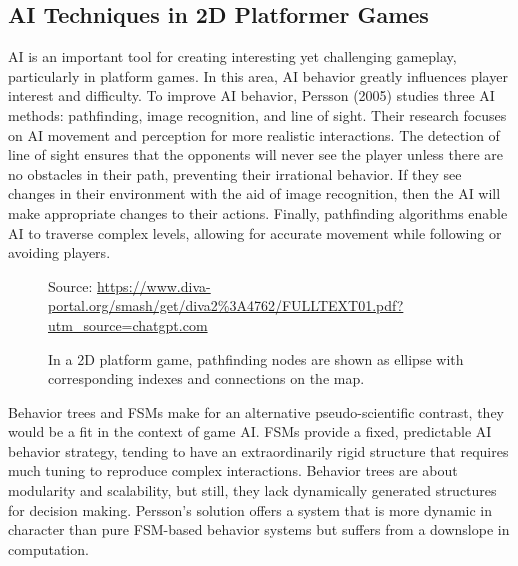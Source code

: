 \documentclass[12pt,oneside,openright,a4paper]{cpe-english-project}
\begin{document}
\subsection{AI Techniques in 2D Platformer Games}
AI is an important tool for creating interesting yet challenging gameplay, particularly in platform games. In this area, AI behavior greatly influences player interest and difficulty. To improve AI behavior, Persson (2005)\cite {platformer_ai} studies three AI methods: pathfinding, image recognition, and line of sight. Their research focuses on AI movement and perception for more realistic interactions. The detection of line of sight ensures that the opponents will never see the player unless there are no obstacles in their path, preventing their irrational behavior. If they see changes in their environment with the aid of image recognition, then the AI will make appropriate changes to their actions. Finally, pathfinding algorithms enable AI to traverse complex levels, allowing for accurate movement while following or avoiding players.\par
\begin{figure}[!h]
\centering
{}
\caption{In a 2D platform game, pathfinding nodes are shown as ellipse with corresponding indexes and connections on the map.}\label{fig:AITechniq}
Source:
\href{https://www.diva-portal.org/smash/get/diva2\%3A4762/FULLTEXT01.pdf?utm\_source=chatgpt.com}{https://www.diva-portal.org/smash/get/diva2\%3A4762/FULLTEXT01.pdf?utm\_source=chatgpt.com}
\end{figure}
Behavior trees and FSMs make for an alternative pseudo-scientific contrast, they would be a fit in the context of game AI. FSMs provide a fixed, predictable AI behavior strategy, tending to have an extraordinarily rigid structure that requires much tuning to reproduce complex interactions. Behavior trees are about modularity and scalability, but still, they lack dynamically generated structures for decision making. Persson's solution offers a system that is more dynamic in character than pure FSM-based behavior systems but suffers from a downslope in computation.\par
\newpage
\end{document}
